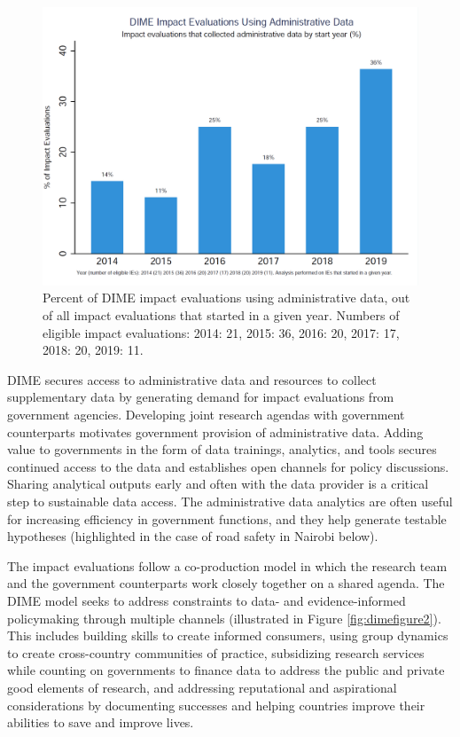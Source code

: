 \begin{figure}
\centering
\includegraphics{./figures/dimefigure1} \caption{Percent of DIME impact evaluations using administrative data, out of all impact evaluations that started in a given  year. Numbers of eligible impact evaluations: 2014: 21, 2015: 36, 2016: 20, 2017: 17, 2018: 20, 2019: 11.}\label{fig:dimefigure1}
\end{figure}

DIME secures access to administrative data and resources to collect supplementary data by generating demand for impact evaluations from government agencies. Developing joint research agendas with government counterparts motivates government provision of administrative data. Adding value to governments in the form of data trainings, analytics, and tools secures continued access to the data and establishes open channels for policy discussions. Sharing analytical outputs early and often with the data provider is a critical step to sustainable data access. The administrative data analytics are often useful for increasing efficiency in government functions, and they help generate testable hypotheses (highlighted in the case of road safety in Nairobi below).

The impact evaluations follow a co-production model in which the research team and the government counterparts work closely together on a shared agenda. The DIME model seeks to address constraints to data- and evidence-informed policymaking through multiple channels (illustrated in Figure \ref{fig:dimefigure2}). This includes building skills to create informed consumers, using group dynamics to create cross-country communities of practice, subsidizing research services while counting on governments to finance data to address the public and private good elements of research, and addressing reputational and aspirational considerations by documenting successes and helping countries improve their abilities to save and improve lives.

